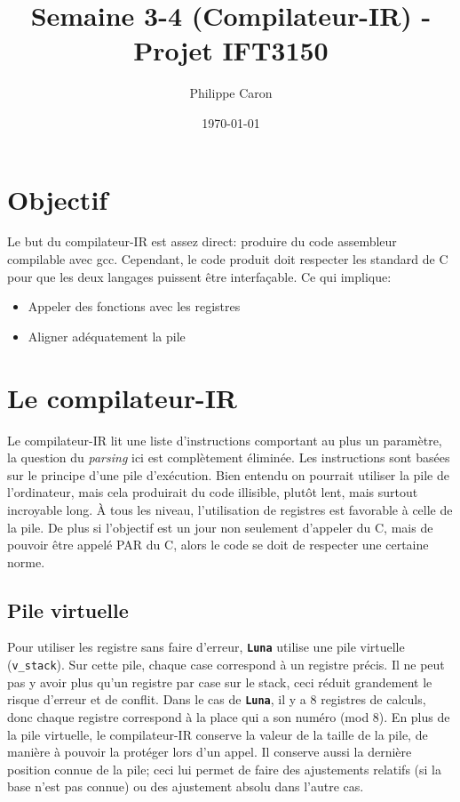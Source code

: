 \documentclass{article}
\title{Semaine 3-4 (Compilateur-IR) - Projet IFT3150}
\date{\today}
\author{Philippe Caron}
\newcommand{\luna}{\textbf{\texttt{Luna}}}
\begin{document}
\maketitle

\section{Objectif}
Le but du compilateur-IR est assez direct: produire du code assembleur compilable avec gcc. Cependant, le code produit doit respecter les standard de C pour que les deux langages puissent être interfaçable. Ce qui implique:
\begin{itemize}
\item Appeler des fonctions avec les registres
\item Aligner adéquatement la pile
\end{itemize}

\section{Le compilateur-IR}
Le compilateur-IR lit une liste d'instructions comportant au plus un paramètre, la question du \textit{parsing} ici est complètement éliminée. Les instructions sont basées sur le principe d'une pile d'exécution. Bien entendu on pourrait utiliser la pile de l'ordinateur, mais cela produirait du code illisible, plutôt lent, mais surtout incroyable long. À tous les niveau, l'utilisation de registres est favorable à celle de la pile. De plus si l'objectif est un jour non seulement d'appeler du C, mais de pouvoir être appelé PAR du C, alors le code se doit de respecter une certaine norme.

\subsection{Pile virtuelle}
Pour utiliser les registre sans faire d'erreur, \luna{} utilise une pile virtuelle (\texttt{v\_{}stack}). Sur cette pile, chaque case correspond à un registre précis. Il ne peut pas y avoir plus qu'un registre par case sur le stack, ceci réduit grandement le risque d'erreur et de conflit. Dans le cas de \luna{}, il y a 8 registres de calculs, donc chaque registre correspond à la place qui a son numéro (mod 8). En plus de la pile virtuelle, le compilateur-IR conserve la valeur de la taille de la pile, de manière à pouvoir la protéger lors d'un appel. Il conserve aussi la dernière position connue de la pile; ceci lui permet de faire des ajustements relatifs (si la base n'est pas connue) ou des ajustement absolu dans l'autre cas.
\end{document}
